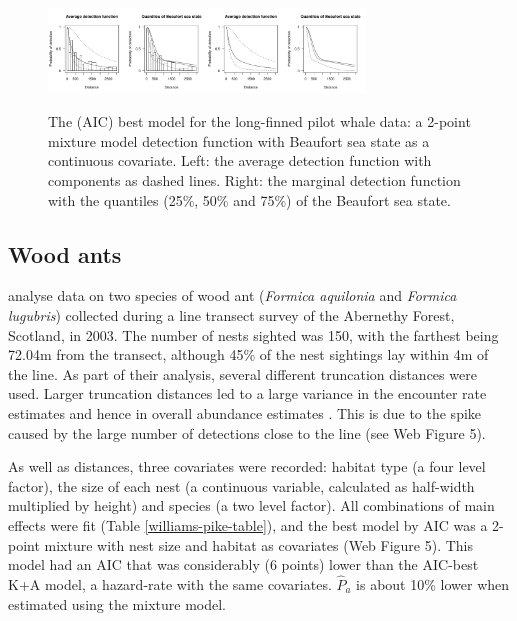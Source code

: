 \documentclass[useAMS,referee,usenatbib]{biom}
\begin{document}
\begin{figure}
\centering
\includegraphics[width=0.375\textwidth, trim= 0 0 3.8in 0, clip=true]{analyses/danpike-bssc.pdf}\includegraphics[width=0.375\textwidth, trim= 3.8in 0 0 0, clip=true]{analyses/danpike-bssc-hh.pdf}
\caption{The (AIC) best model for the long-finned pilot whale data: a 2-point mixture model detection function with Beaufort sea state as a continuous covariate. Left: the average detection function with components as dashed lines. Right: the marginal detection function with the quantiles (25\%, 50\% and 75\%) of the Beaufort sea state.}
\label{danpike-detfct}
\end{figure}


\subsection{Wood ants}
\label{s:woodant}

\cite{Borkin:2012vj} analyse data on two species of wood ant (\textit{Formica aquilonia} and \textit{Formica lugubris}) collected during a line transect survey of the Abernethy Forest, Scotland, in 2003. The number of nests sighted was 150, with the farthest being 72.04m from the transect, although 45\% of the nest sightings lay within 4m of the line. As part of their analysis, several different truncation distances were used. Larger truncation distances led to a large variance in the encounter rate estimates and hence in overall abundance estimates \citep[][]{Borkin:2012vj}. This is due to the spike caused by the large number of detections close to the line (see Web Figure 5).

As well as distances, three covariates were recorded: habitat type (a four level factor), the size of each nest (a continuous variable, calculated as half-width multiplied by height) and species (a two level factor). All combinations of main effects were fit (Table \ref{williams-pike-table}), and the best model by AIC was a 2-point mixture with nest size and habitat as covariates (Web Figure 5). This model had an AIC that was considerably (6 points) lower than the AIC-best K+A model, a hazard-rate with the same covariates.  $\hat{P}_a$ is about 10\% lower when estimated using the mixture model.
\end{document}
